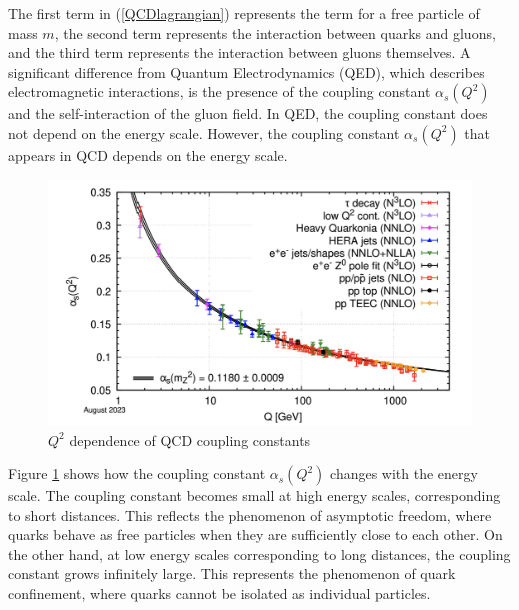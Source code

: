         The first term in (\ref{QCDlagrangian}) represents the term for a free particle of mass $m$, the second term represents the interaction between quarks and gluons, and the third term represents the interaction between gluons themselves. A significant difference from Quantum Electrodynamics (QED), which describes electromagnetic interactions, is the presence of the coupling constant $\alpha_s(Q^2)$ and the self-interaction of the gluon field. In QED, the coupling constant does not depend on the energy scale. However, the coupling constant $\alpha_s(Q^2)$ that appears in QCD depends on the energy scale.
        \begin{figure}[htbp]
            \centering
            \includegraphics[keepaspectratio, scale=0.6]{fig/1_1_coupling_constant.png}
            \caption{$Q^2$ dependence of QCD coupling constants}
            \label{coupling_constant}
        \end{figure}
        Figure \ref{coupling_constant} shows how the coupling constant $\alpha_s(Q^2)$ changes with the energy scale\cite{ParticleDataGroup:2024cfk}. The coupling constant becomes small at high energy scales, corresponding to short distances. This reflects the phenomenon of asymptotic freedom, where quarks behave as free particles when they are sufficiently close to each other. On the other hand, at low energy scales corresponding to long distances, the coupling constant grows infinitely large. This represents the phenomenon of quark confinement, where quarks cannot be isolated as individual particles.
        
